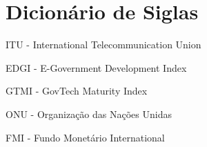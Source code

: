 \section{Dicionário de Siglas}

ITU - International Telecommunication Union

EDGI - E-Government Development Index

GTMI - GovTech Maturity Index

ONU - Organização das Nações Unidas

FMI - Fundo Monetário International